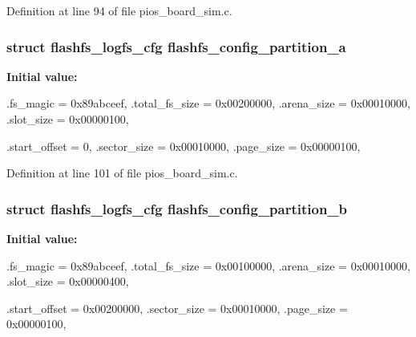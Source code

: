 \-Definition at line 94 of file pios\-\_\-board\-\_\-sim.\-c.

\hypertarget{group___revolution_gaba5cc3d568259a61d596b4cd0c63bad8}{
\subsubsection[{flashfs\-\_\-config\-\_\-partition\-\_\-a}]{\setlength{\rightskip}{0pt plus 5cm}struct {\bf flashfs\-\_\-logfs\-\_\-cfg} {\bf flashfs\-\_\-config\-\_\-partition\-\_\-a}}}\label{group___revolution_gaba5cc3d568259a61d596b4cd0c63bad8}
{\bfseries \-Initial value\-:}
\begin{DoxyCode}
 {
        .fs_magic      = 0x89abceef,
        .total_fs_size = 0x00200000, 
        .arena_size    = 0x00010000, 
        .slot_size     = 0x00000100, 

        .start_offset  = 0,          
        .sector_size   = 0x00010000, 
        .page_size     = 0x00000100, 
}
\end{DoxyCode}


\-Definition at line 101 of file pios\-\_\-board\-\_\-sim.\-c.

\hypertarget{group___revolution_ga6d0bc62b8797aa4539687ed6b976e503}{
\subsubsection[{flashfs\-\_\-config\-\_\-partition\-\_\-b}]{\setlength{\rightskip}{0pt plus 5cm}struct {\bf flashfs\-\_\-logfs\-\_\-cfg} {\bf flashfs\-\_\-config\-\_\-partition\-\_\-b}}}\label{group___revolution_ga6d0bc62b8797aa4539687ed6b976e503}
{\bfseries \-Initial value\-:}
\begin{DoxyCode}
 {
        .fs_magic      = 0x89abceef,
        .total_fs_size = 0x00100000, 
        .arena_size    = 0x00010000, 
        .slot_size     = 0x00000400, 

        .start_offset  = 0x00200000, 
        .sector_size   = 0x00010000, 
        .page_size     = 0x00000100, 
}
\end{DoxyCode}


